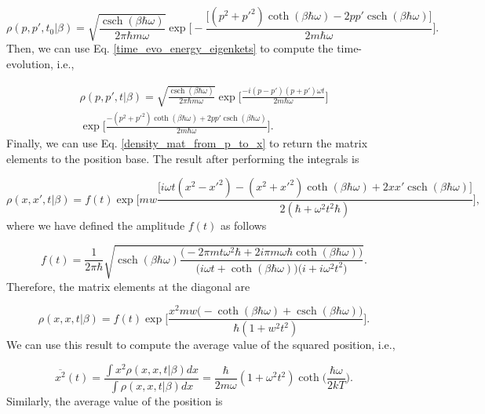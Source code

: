 \documentclass{article}
\DeclareMathOperator{\csch}{csch}
\begin{document}
\begin{equation}\label{harmonic_osc_density_mat_momentum_base}
    \rho(p, p', t_{0}|\beta) = \sqrt{\frac{\csch(\beta \hbar \omega)}{2\pi \hbar m \omega}} \exp \bigg[ -\frac{\big[ (p^{2}+p'^{2})\coth(\beta \hbar \omega) - 2pp'\csch(\beta \hbar \omega) \big]}{2m\hbar \omega} \bigg].
\end{equation}
%
Then, we can use Eq. \ref{time_evo_energy_eigenkets} to compute the time-evolution, i.e.,

\begin{multline}
    \rho(p, p', t|\beta) = \sqrt{\frac{\csch(\beta \hbar \omega)}{2\pi \hbar m \omega}} \exp \bigg[ \frac{-i(p-p')(p+p')\omega t}{2m\hbar \omega} \bigg] \\ \exp \bigg[ \frac{ -(p^{2}+p'^{2})\coth(\beta \hbar \omega) + 2pp'\csch(\beta \hbar \omega) }{2m \hbar \omega} \bigg].
\end{multline}
%
Finally, we can use Eq. \ref{density_mat_from_p_to_x} to return the matrix elements to the position base. The result after performing the integrals is

\begin{equation}
    \rho(x, x', t|\beta) = f(t) \exp \Bigg[ mw \frac{\big[ i\omega t(x^{2}-x'^{2})-(x^{2}+x'^{2})\coth(\beta \hbar \omega) + 2xx' \csch(\beta \hbar \omega) \big]}{2(\hbar + \omega^{2}t^{2}\hbar)} \Bigg],
\end{equation}
%
where we have defined the amplitude $f(t)$ as follows

\begin{equation}
    f(t)=\frac{1}{2\pi \hbar} \sqrt{ \csch(\beta \hbar \omega) \frac{\big(-2\pi m t \omega^{2} \hbar + 2i\pi m \omega \hbar \coth(\beta \hbar \omega)\big)}{\big( i\omega t + \coth(\beta \hbar \omega) \big) \big( i + i\omega^{2} t^{2} \big)}}.
\end{equation}
%
Therefore, the matrix elements at the diagonal are

\begin{equation}
    \rho(x, x, t|\beta) = f(t) \exp \bigg[\frac{x^{2}mw \big( -\coth(\beta \hbar \omega) + \csch(\beta \hbar \omega) \big)}{\hbar (1+w^{2}t^{2})} \bigg].
\end{equation}
%
We can use this result to compute the average value of the squared position, i.e.,

\begin{equation}
    \overline{x^{2}} (t)= \frac{\int x^{2} \rho(x,x,t|\beta) dx}{\int \rho(x,x,t|\beta) dx} =  \frac{\hbar}{2m\omega}(1+\omega^{2}t^{2})\coth \bigg( \frac{\hbar \omega}{2 k T} \bigg).
\end{equation}
%
Similarly, the average value of the position is
\end{document}

